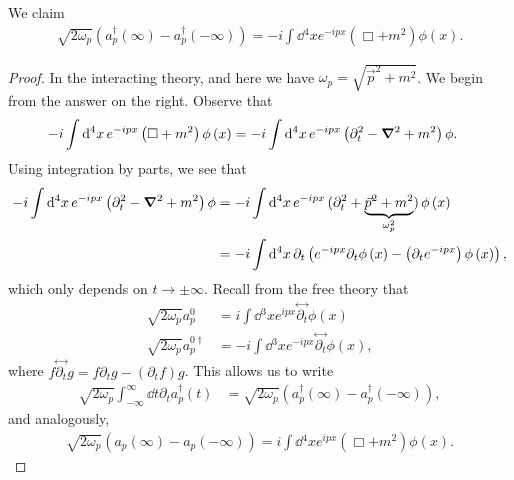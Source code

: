 \begin{claim}
    We claim
    \begin{align}
        \sqrt{2 \omega_p}  \left( a_p^{\dag} \left( \infty \right) - a^{\dag}_p \left( - \infty \right)  \right) = -i \int \dd{^{4}x} e^{-i p x} \left( \Box + m^2 \right) \phi \left( x \right) 
    .\end{align}
\end{claim}

\begin{proof}
    In the interacting theory, and here we have $\omega_p = \sqrt{\vec{p}^2 + m^2} $. We begin from the answer on the right. Observe that
    \begin{align}
        -i \int \dd{^{4}x} e^{-i px} \left( \Box + m^2 \right) \phi \left( x \right) &= -i \int \dd{^{4}x} e^{-i p x} \left( \partial_t^2 - \grad^2 + m^2 \right)\phi
    .\end{align}
    Using integration by parts, we see that
    \begin{align}
        -i \int \dd{^{4}x} e^{-i p x} \left( \partial_t^2 - \grad^2 + m^2 \right)\phi &= -i \int \dd{^{4}x} e^{-i px}\, ( \partial_t^2 + \underbrace{\vec{p}^2 + m^2}_{\omega_p^2} ) \,\phi \left( x \right) \\
       &= -i \int \dd{^{4}x} \partial_t \left( e^{-i p x} \partial_t \phi \left( x \right) - \left( \partial_t e^{-i p x} \right) \phi \left( x \right)  \right) 
    ,\end{align}
    which only depends on $t \to \pm \infty$.
    Recall from the free theory that
    \begin{align}
        \sqrt{2 \omega_p}  a^{0}_p &= i \int \dd{^3x} e^{ipx} \overset{\leftrightarrow}{\partial_t} \phi \left( x \right)  \\
        \sqrt{2 \omega_p}  a^{0\dagger}_p &= -i \int \dd{^3x} e^{-ipx} \overset{\leftrightarrow}{\partial_t} \phi \left( x \right)
    ,\end{align}
    where $f \overset{\leftrightarrow}{\partial_t} g = f \partial_t g - \left( \partial_t f \right) g$.
    This allows us to write
    \begin{align}
        \sqrt{2 \omega_p}  \int_{-\infty}^{\infty} \dd{t} \partial_t a_p^{\dag} \left( t \right) &= \sqrt{2 \omega_p} \left( a_p^{\dag} \left( \infty \right) - a_p^{\dag} \left( - \infty \right)  \right)
    ,\end{align}
    and analogously,
    \begin{align}
        \sqrt{2 \omega_p}  \left( a_p \left( \infty \right) - a_p \left( -\infty \right)  \right) = i \int \dd{^{4}x} e^{ipx} \left( \Box + m^2 \right) \phi \left( x \right) 
    .\end{align}

\end{proof}


